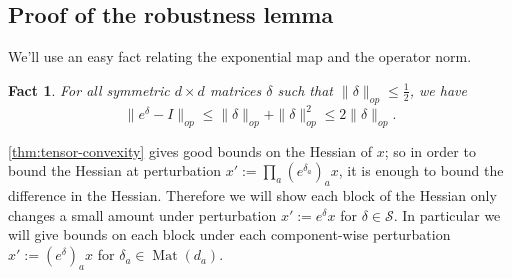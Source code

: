 \documentclass[aos]{imsart}
\newtheorem{corollary}[theorem]{Corollary}
\newtheorem{fact}[theorem]{Fact}
\theoremstyle{definition}
\numberwithin{equation}{section}
\DeclareMathOperator{\mat}{Mat}
\DeclareMathOperator{\tr}{Tr}
\newcommand{\R}{{\mathbb{R}}}
\newcommand{\Sym}{\mathcal{S}}
\newcommand{\samp}{x}
\newcommand{\CF}[1]{{\color{purple}[CF: #1]}}
\begin{document}
\begin{appendix}


\section{Proof of the robustness lemma}
We'll use an easy fact relating the exponential map and the operator norm.

\begin{fact} For all symmetric $d\times d$ matrices $\delta $ such that $ \|\delta\|_{op} \leq \frac{1}{2}$, we have
$$ \|e^{\delta} - I\|_{op} \leq \|\delta\|_{op} + \|\delta\|_{op}^{2} \leq 2 \|\delta\|_{op}.$$
\end{fact}

\cref{thm:tensor-convexity} gives good bounds on the Hessian of $\samp$; so in order to bound the Hessian at perturbation $\samp' := \prod_{a} (e^{\delta_{a}})_{a} \samp$, it is enough to bound the difference in the Hessian.
Therefore we will show each block of the Hessian only changes a small amount under perturbation $x' := e^{\delta} x$ for $\delta \in \Sym$. In particular we will give bounds on each block under each component-wise perturbation $x' := (e^{\delta})_{a} x$ for $\delta_{a} \in \mat(d_{a})$.



\end{appendix}
\end{document}
